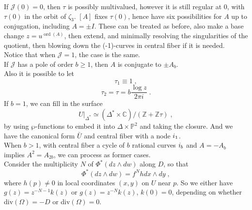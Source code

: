 If $\mathscr{J}(0)=0$, then $\tau$ is possibly multivalued, however it is still regular at 0, with $\tau(0)$ in the orbit of $\zeta_3$. $[A]$ fixes $\tau(0)$, hence have six possibilities for $A$ up to conjugation, including $A=\pm I$. These can be treated as before, also make a base change $z=u^{\operatorname{ord}(A)}$, then extend, and minimally resolving the singularities of the quotient, then blowing down the (-1)-curves in central fiber if it is needed.\\ \indent
Notice that when $\mathscr{J}=1$, the case is the same.\\ \indent
If $\mathscr{J}$ has a pole of order $b\geq 1$, then $A$ is conjugate to $\pm A_b$.\\
\indent Also it is possible to let \[ \tau_1\equiv 1\;, \]
\[ \tau_2=\tau=b\frac{\log z}{2\pi i}\; . \]
\indent If $b=1$, we can fill in the surface 
\[ U|_{\Delta^*}\simeq (\Delta^*\times \mathbb{C})/(\mathbb{Z}+\mathbb{Z}\tau)\; , \]
by using $\wp$-functions to embed it into $\Delta\times \mathbb{P}^2$ and taking the closure. And we have the canonical form $\bar{U}$ and central fiber with a node $\uppercase\expandafter{\romannumeral1}_1$.\\ \indent When $b>1$, with central fiber a cycle of $b$ rational curves $\uppercase\expandafter{\romannumeral1}_b$ and $A=-A_b$ implies $A^2=A_{2b}$, we can process as former cases.\\ \indent
Consider the multiplicity $N$ of $\Phi^*(dz\wedge dw)$ along $D$, so that \[ \Phi^*(dz\wedge dw)=f^Nhdx\wedge dy\; , \]
where $h(p)\neq 0$ in local coordinates $(x,y)$ on $U $ near $p$. So we either have $g(z)=z^{-N-1}k(z)$ or $g(z)=z^{-N}k(z)$, $k(0)=0$, depending on whether div$(\Omega)=-D$ or div$(\Omega)=0$.




